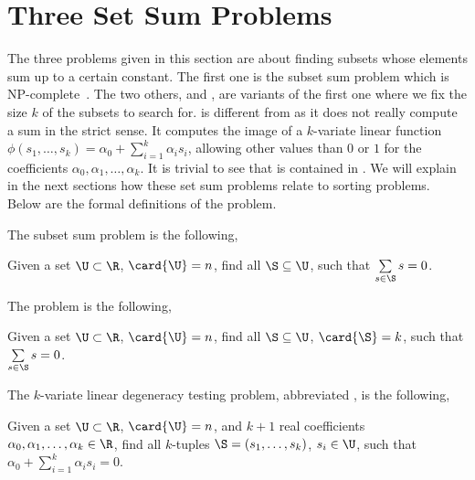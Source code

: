 
\section{Three Set Sum Problems}

The three problems given in this section are about finding subsets whose
elements sum up to a certain constant. The first one is the subset sum problem
which is NP-complete~\cite{karp:1972}. The two others, \kSUM and \kLDT, are
variants of the first one where we fix the size $k$ of the subsets to search
for. \kLDT is different from \kSUM as it does not really compute a sum in the
strict sense.  It computes the image of a $k$-variate linear function
$\phi(s_1, \ldots, s_k) = \alpha_0 + \sum_{i=1}^{k} \alpha_i s_i$, allowing
other values than $0$ or $1$ for the coefficients $\alpha_0, \alpha_1, \ldots,
\alpha_k$. It is trivial to see that \kSUM is contained in \kLDT. We will
explain in the next sections how these set sum problems relate to sorting
problems. Below are the formal definitions of the problem.

The subset sum problem is the following,

\begin{problem}
Given a set $\U \subset \R$, $\card{\U} = n$, find all
$\S \subseteq \U$, such that $\sum\limits_{s \in \S} s = 0$.
\end{problem}


The \kSUM problem is the following,

\begin{problem}
Given a set $\U \subset \R$, $\card{\U} = n$, find all
$\S \subseteq \U$, $\card{\S} = k$, such that $\sum\limits_{s
\in \S} s = 0$.
\end{problem}


The $k$-variate linear degeneracy testing problem, abbreviated \kLDT, is the
following,

\begin{problem}
Given a set $\U \subset \R$, $\card{\U} = n$, and $k+1$ real
coefficients $\alpha_0, \alpha_1, \ldots, \alpha_k \in \R$, find all $k$-tuples
$\S = (s_1, \ldots, s_k)$, $s_i \in \U$, such that
$\alpha_0 + \sum_{i=1}^{k} \alpha_i s_i = 0$.
\end{problem}
